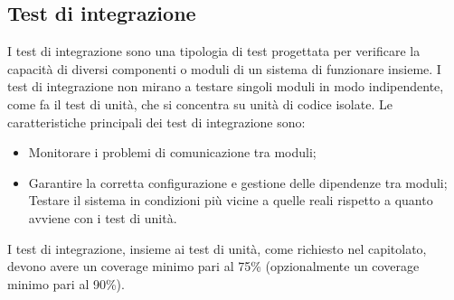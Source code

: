 \subsection{Test di integrazione}
I test di integrazione sono una tipologia di test progettata per verificare la capacità di diversi componenti o moduli di un sistema di funzionare insieme. I test di integrazione non mirano a testare singoli moduli in modo indipendente, come fa il test di unità, che si concentra su unità di codice isolate. Le caratteristiche principali dei test di integrazione sono:
\begin{itemize}
    \item Monitorare i problemi di comunicazione tra moduli;
    \item Garantire la corretta configurazione e gestione delle dipendenze tra moduli;
    Testare il sistema in condizioni più vicine a quelle reali rispetto a quanto avviene con i test di unità.
\end{itemize}
I test di integrazione, insieme ai test di unità, come richiesto nel capitolato, devono avere un coverage minimo pari al 75\% (opzionalmente un coverage minimo pari al 90\%).

